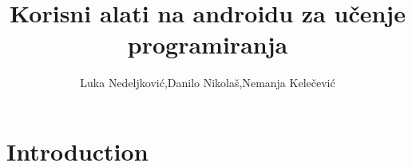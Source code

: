 \documentclass{article}
\title{Korisni alati na androidu za učenje programiranja}
\author{Luka Nedeljković,Danilo Nikolaš,Nemanja Kelečević }
\begin{document}
	
	\maketitle
	
	\section{Introduction}
	
\end{document}
